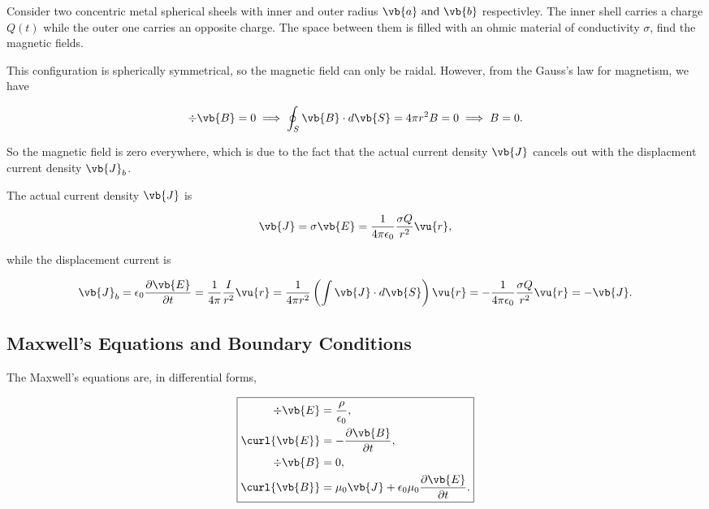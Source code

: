 \documentclass[english,a4paper,12pt]{report}
\begin{document}
{Consider two concentric metal spherical sheels with inner and outer radius \(\vb{a} \text { and } \vb{b} \) respectivley. The inner shell carries a charge \(Q(t)\) while the outer one carries an opposite charge. The space between them is filled with an ohmic material of conductivity \(\sigma \), find the magnetic fields.   }
{This configuration is spherically symmetrical, so the magnetic field can only be raidal. However, from the Gauss's law for magnetism, we have 

\begin{equation}
    \div{\vb{B} } =0 \implies \oint_{S} \vb{B} \cdot d\vb{S} = 4\pi r^2B = 0 \implies B=0.
\end{equation}

So the magnetic field is zero everywhere, which is due to the fact that the actual current density \(\vb{J} \) cancels out with the displacment current density \(\vb{J} _{b} \).

The actual current density \(\vb{J} \) is 

\begin{equation}
    \vb{J} = \sigma \vb{E} = \frac{1}{4\pi \epsilon_0} \frac{\sigma Q}{r^2}\vu{r}, 
\end{equation}

while the displacement current is 

\begin{equation}
    \vb{J} _{b} = \epsilon_0 \frac{\partial \vb{E} }{\partial t} = \frac{1}{4\pi } \frac{I}{r^2}\vu{r} = \frac{1}{4\pi r^2}\left( \int \vb{J} \cdot d\vb{S} \right)\vu{r} = -\frac{1}{4\pi \epsilon_0} \frac{\sigma Q}{r^2}\vu{r} = -\vb{J} . 
\end{equation}
}

\subsection{Maxwell's Equations and Boundary Conditions}

The Maxwell's equations are, in differential forms,

\begin{equation}
    \boxed{
    \begin{aligned}
        \div{\vb{E} } &= \frac{\rho }{\epsilon_0 } ,\\
        \curl{\vb{E} } &= -\frac{\partial \vb{B} }{\partial t},\\
        \div{\vb{B} } &= 0,\\
        \curl{\vb{B}} &= \mu_0 \vb{J} + \epsilon_0 \mu_0 \frac{\partial \vb{E} }{\partial t}.     
    \end{aligned}}
\end{equation}
\end{document}
